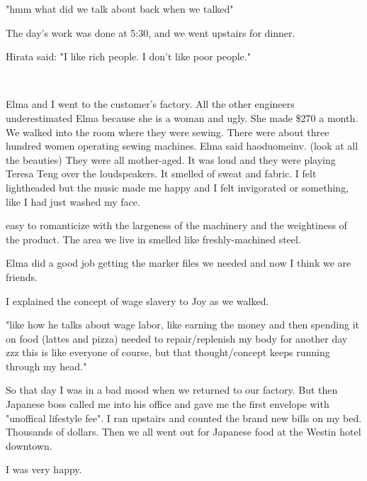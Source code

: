 "hmm what did we talk about back when we talked"

The day's work was done at 5:30, and we went upstairs for dinner.

Hirata said: "I like rich people. I don't like poor people."

~

Elma and I went to the customer's factory. All the other
engineers underestimated Elma because she is a woman and ugly. She made \$270 a
month. We walked into the room where they were sewing. There were about three
hundred women operating sewing machines. Elma said haoduomeinv.  (look at all the
beauties)  They were all mother-aged. It was loud and they were playing Teresa
Teng over the loudspeakers. It smelled of sweat and fabric. I felt lightheaded
but the music made me happy and I felt invigorated or something, like I had
just washed my face.

easy to romanticize with the largeness of the machinery and the weightiness of
the product. The area we live in smelled like freshly-machined steel.

Elma did a good job getting the marker files we needed and now I think we are
friends.

I explained the concept of wage slavery to Joy as we walked.

"like how he talks about wage labor, like earning the money and then spending
it on food (lattes and pizza) needed to repair/replenish my body for another
day zzz this is like everyone of course, but that thought/concept keeps running
through my head."

So that day I was in a bad mood when we returned to our factory. But then
Japanese boss called me into his office and gave me the first envelope with
"unoffical lifestyle fee". I ran upstairs and counted the brand new bills on my
bed.  Thousands of dollars.  Then we all went out for Japanese food at the
Westin hotel downtown.

I was very happy.
